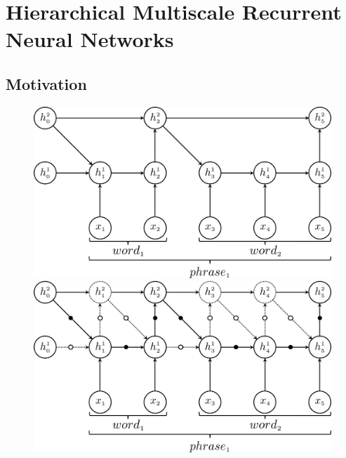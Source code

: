\documentclass{article} %
\begin{document}
\section{Hierarchical Multiscale Recurrent Neural Networks}
\label{sec:model}
\subsection{Motivation}
\label{sec:motivation}
\begin{figure}[t]
    \vspace*{-0.5cm}
	\begin{minipage}{1.\columnwidth}
		\begin{minipage}{0.48\columnwidth}
			\centering
             \includegraphics[width=1.\columnwidth]{motiv_1.pdf}
         \end{minipage}
         \hfill
         \begin{minipage}{0.48\columnwidth}
             \centering
             \includegraphics[width=1.\columnwidth]{motiv_2.pdf}
         \end{minipage}

\end{minipage}
\end{figure}
\end{document}
